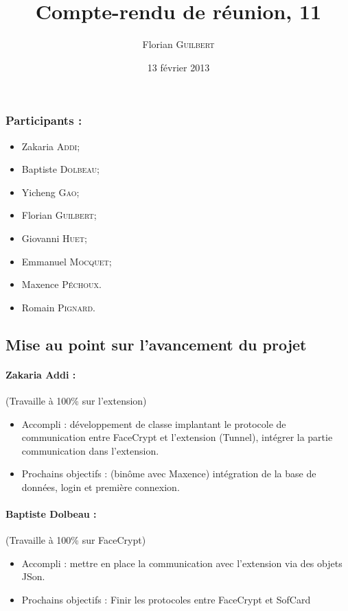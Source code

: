 \documentclass[a4paper,10pt]{article}
\author{Florian \textsc{Guilbert}}
\title{Compte-rendu de réunion, 11}
\date{13 février 2013}
\begin{document}
\maketitle

\subsubsection*{Participants : }
\begin{itemize}
    \item Zakaria \textsc{Addi};
    \item Baptiste \textsc{Dolbeau};
    \item Yicheng \textsc{Gao};
    \item Florian \textsc{Guilbert};
    \item Giovanni \textsc{Huet};
    \item Emmanuel \textsc{Mocquet};
    \item Maxence  \textsc{Péchoux}.
    \item Romain \textsc{Pignard}.
\end{itemize}

\subsection*{Mise au point sur l'avancement du projet}

\paragraph{Zakaria Addi :} (Travaille à 100\% sur l'extension)\\
\begin{itemize}
    \item Accompli : développement de classe implantant le protocole
        de communication entre FaceCrypt et l'extension (Tunnel), intégrer la
        partie communication dans l'extension.
    \item Prochains objectifs : (binôme avec Maxence) intégration de la 
    base de données, login et première connexion.
\end{itemize}

\paragraph{Baptiste Dolbeau :} (Travaille à 100\% sur FaceCrypt)
\begin{itemize}
\item Accompli : mettre en place la communication avec l'extension via des 
    objets JSon. 
\item Prochains objectifs : Finir les protocoles entre FaceCrypt et SofCard
\end{itemize}
\end{document}
